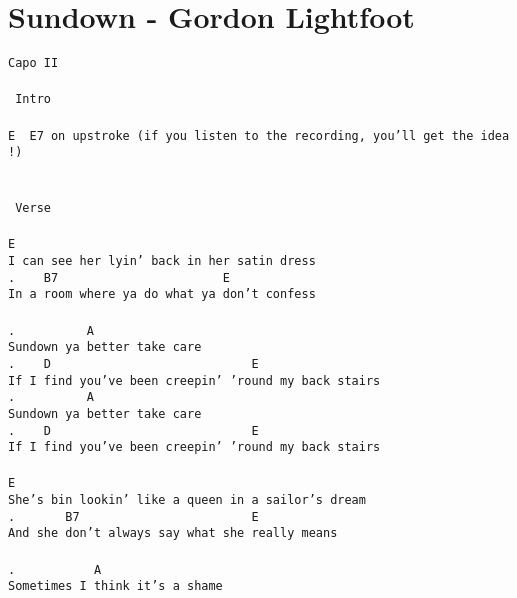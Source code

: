 \newpage
\section{Sundown - Gordon Lightfoot}
\label{Sundown - Gordon Lightfoot}
\texttt{Capo\ II\\
\\
\lbrack\ Intro\rbrack\\
\\
E\ \ E7\ on\ upstroke\ (if\ you\ listen\ to\ the\ recording,\ you'll\ get\ the\ idea!)\\
\\
\\
\lbrack\ Verse\rbrack\\
\\
E\ \ \ \ \ \ \ \ \ \ \ \ \ \ \ \ \ \ \ \ \ \ \ \ \ \ \ \\
I\ can\ see\ her\ lyin'\ back\ in\ her\ satin\ dress\\
.\ \ \ \ B7\ \ \ \ \ \ \ \ \ \ \ \ \ \ \ \ \ \ \ \ \ \ \ E\\
In\ a\ room\ where\ ya\ do\ what\ ya\ don't\ confess\\
\\
.\ \ \ \ \ \ \ \ \ \ A\\
Sundown\ ya\ better\ take\ care\\
.\ \ \ \ D\ \ \ \ \ \ \ \ \ \ \ \ \ \ \ \ \ \ \ \ \ \ \ \ \ \ \ \ E\\
If\ I\ find\ you've\ been\ creepin'\ 'round\ my\ back\ stairs\\
.\ \ \ \ \ \ \ \ \ \ A\ \ \ \ \ \ \ \ \ \ \ \ \ \ \ \ \ \\
Sundown\ ya\ better\ take\ care\\
.\ \ \ \ D\ \ \ \ \ \ \ \ \ \ \ \ \ \ \ \ \ \ \ \ \ \ \ \ \ \ \ \ E\\
If\ I\ find\ you've\ been\ creepin'\ 'round\ my\ back\ stairs\\
\\
E\ \ \ \ \ \ \ \ \ \ \ \ \ \ \ \ \ \ \ \ \ \ \ \ \ \ \ \ \ \ \ \ \\
She's\ bin\ lookin'\ like\ a\ queen\ in\ a\ sailor's\ dream\\
.\ \ \ \ \ \ \ B7\ \ \ \ \ \ \ \ \ \ \ \ \ \ \ \ \ \ \ \ \ \ \ \ E\\
And\ she\ don't\ always\ say\ what\ she\ really\ means\\
\\
.\ \ \ \ \ \ \ \ \ \ \ A\ \ \ \ \ \ \ \ \ \ \\
Sometimes\ I\ think\ it's\ a\ shame\\
}
